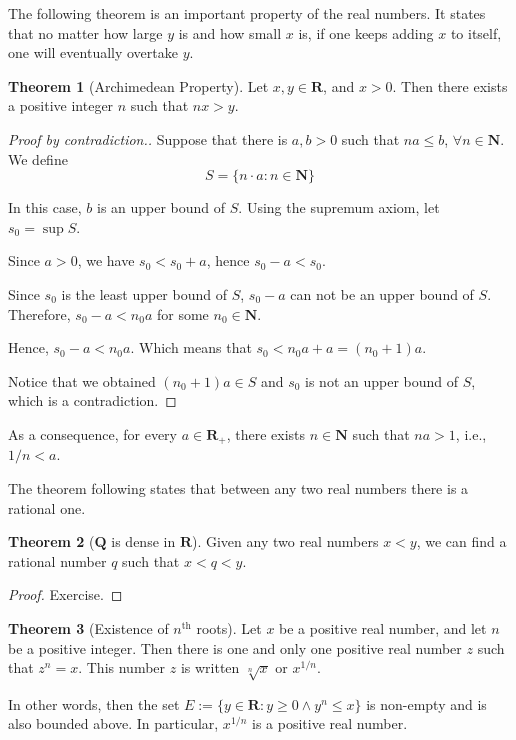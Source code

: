 \documentclass[12pt,a4paper]{article}
\theoremstyle{definition}
\newtheorem{theorem}{Theorem}[section]
\begin{document}

The following theorem is an important property of the real numbers. It states that no matter how large $y$ is and how small $x$ is, if one keeps adding $x$ to itself, one will eventually overtake $y$.

\begin{theorem}[Archimedean Property]
  Let $x, y \in \textbf{R}$, and $x > 0$. Then there exists a positive integer $n$ such that $nx > y$.
\end{theorem}

\begin{proof}[Proof by contradiction.]
	Suppose that there is $a,b > 0$ such that $na \leq b$, $\forall n \in \textbf{N}$. We define \[ S = \{ n \cdot a : n \in \textbf{N} \} \]
	
	In this case, $b$ is an upper bound of $S$. Using the supremum axiom, let $s_0 = \sup S$.
	
	Since $a > 0$, we have $s_0 < s_0 + a$, hence $s_0 - a < s_0$.
	
	Since $s_0$ is the least upper bound of $S$, $s_0 - a$ can not be an upper bound of $S$. Therefore, $s_0 - a < n_0 a$ for some $n_0 \in \textbf{N}$.
	
	Hence, $s_0 - a < n_0 a$. Which means that $s_0 < n_0 a + a = (n_0 + 1) a$.
	
	Notice that we obtained $(n_0 + 1)a \in S$ and $s_0$ is not an upper bound of $S$, which is a contradiction.
\end{proof}

As a consequence, for every $a \in \textbf{R}_+$, there exists $n \in \textbf{N}$ such that $n a > 1$, i.e., $1/n < a$.

The theorem following states that between any two real numbers there is a rational one.

\begin{theorem}[$\textbf{Q}$ is dense in $\textbf{R}$]
  Given any two real numbers $x < y$, we can find a rational number $q$ such that $x < q < y$.
\end{theorem}

\begin{proof} 
	Exercise. %
\end{proof}

\begin{theorem}[Existence of $n^\text{th}$ roots]
  Let $x$ be a positive real number, and let $n$ be a positive integer. Then there is one and only one positive real number $z$ such that $z^n = x$. This number $z$ is written $\sqrt[n]{x}$ or $x^{1/n}$.
  
  In other words, then the set $E := \{y \in \textbf{R} : y \geq 0 \land y^n \leq x \}$ is non-empty and is also bounded above. In particular, $x^{1/n}$ is a positive real number.
\end{theorem}
\end{document}
